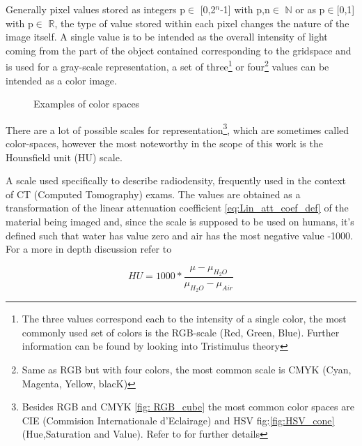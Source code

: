 Generally pixel values stored as integers p$\in$ [0,2$^{n}$-1] with p,n$\in$ $\mathbb{N}$  or as p$\in$[0,1] with p$\in$ $\mathbb{R}$, the type of value stored within each pixel changes the nature of the image itself. 
A single value is to be intended as the overall intensity of light coming from the part of the object contained corresponding to the gridspace and is used for a gray-scale representation, a set of three\footnote{The three values correspond each to the intensity of a single color, the most commonly used set of colors is the RGB-scale (Red, Green, Blue). Further information can be found by looking into Tristimulus theory\cite{Tristimulus}}  or four\footnote{Same as RGB but with four colors, the most common scale is CMYK (Cyan, Magenta, Yellow, blacK)} values can be intended as a color image.

\begin{figure}[H]
     \centering
    \qquad
     \caption{Examples of color spaces}
     \label{fig:color_spaces}
\end{figure}

There are a lot of possible scales for representation\footnote{Besides RGB and CMYK \ref{fig: RGB_cube} the most common color spaces are CIE (Commision Internationale d’Eclairage) and HSV fig:\ref{fig:HSV_cone} (Hue,Saturation and Value). Refer to \cite{Color_spaces} for further details}, which are sometimes called color-spaces, however the most noteworthy in the scope of this work is the Hounsfield unit (HU) scale.

\begin{definition}
A scale used specifically to describe radiodensity, frequently used in the context of CT (Computed Tomography) exams. The values are obtained as a transformation of the linear attenuation coefficient \ref{eq:Lin_att_coef_def} of the material being imaged and, since the scale is supposed to be used on humans, it's defined such that water has value zero and air has the most negative value -1000. For  a more in depth discussion refer to \cite{Hounsfield}
\end{definition}

\begin{equation}\label{eq:HU_def}
    HU = 1000*\frac{\mu - \mu_{H_2O}}{\mu_{H_2O} - \mu_{Air}}
\end{equation}

